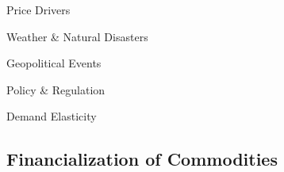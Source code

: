 \documentclass[10pt]{article}
\begin{document}
    \begin{core}{Price Drivers}

      Weather \& Natural Disasters

      Geopolitical Events

      Policy \& Regulation

      Demand Elasticity

    \end{core}

  \subsection{Financialization of Commodities}
\end{document}
